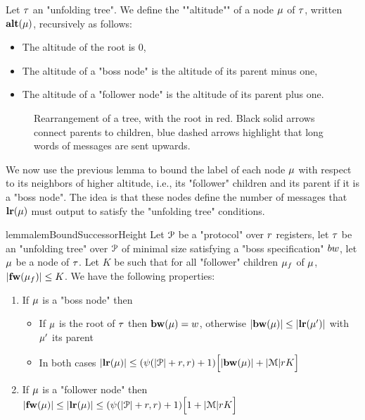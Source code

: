 \begin{definition}
	Let $\tau$ an "unfolding tree". We define the ""altitude"" of a node $\mu$ of $\tau$, written $\mathbf{alt}(\mu)$, recursively as follows:
	\begin{itemize}
		\item The altitude of the root is $0$,
		\item The altitude of a "boss node" is the altitude of its parent minus one,
		\item The altitude of a "follower node" is the altitude of its parent plus one.
	\end{itemize}
\end{definition}

\begin{figure}[h]
	
	\caption{Rearrangement of a tree, with the root in red. Black solid arrows connect parents to children, blue dashed arrows highlight that long words of messages are sent upwards.}
	\label{fig:rearrange-tree}
\end{figure}

We now use the previous lemma to bound the label of each node $\mu$ with respect to its neighbors of higher altitude, i.e., its "follower" children and its parent if it is a "boss node". The idea is that these nodes define the number of messages that $\mathbf{lr}(\mu)$ must output to satisfy the "unfolding tree" conditions.

\begin{restatable}{lemma}{lemBoundSuccessorHeight}
	\label{lem:bound-successor-height}
	Let $\mathcal{P}$ be a "protocol" over $r$ registers, let $\tau$ be an "unfolding tree" over $\mathcal{P}$ of minimal size satisfying a "boss specification" $\bossspec$, let $\mu$ be a node of $\tau$.
	Let $K$ be such that for all "follower" children $\mu_f$ of $\mu$, $|\mathbf{fw}(\mu_f)| \leq K$.
	We have the following properties:
	
	\begin{enumerate}				
		\item  If $\mu$ is a "boss node" then 
		\begin{itemize}
			\item If $\mu$ is the root of $\tau$ then $\mathbf{bw}(\mu) = w$, otherwise $|\mathbf{bw}(\mu)| \leq |\mathbf{lr}(\mu')|$ with $\mu'$ its parent
			
			\item In both cases $|\mathbf{lr}(\mu)| \leq (\psi(|\mathcal{P}|+r,r) + 1)\Big[ |\mathbf{bw}(\mu)| + |\mathcal{M}|rK \Big]$
		\end{itemize}
		
		\item If $\mu$ is a "follower node" then  $|\mathbf{fw}(\mu)| \leq |\mathbf{lr}(\mu)| \leq (\psi(|\mathcal{P}|+r,r) +1)\Big[ 1 + |\mathcal{M}|rK \Big]$
			
	\end{enumerate}
\end{restatable}

